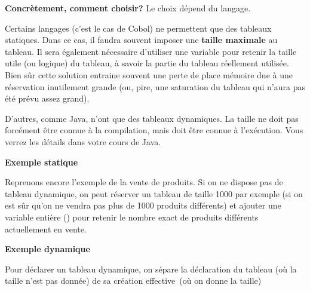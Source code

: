 	\textbf{Concrètement, comment choisir?}
	Le choix dépend du langage.

	Certains langages (c’est le cas de Cobol) ne permettent 
	que des tableaux statiques. Dans ce cas, il faudra souvent
	imposer une \textbf{taille maximale} au tableau. 
	Il sera également nécessaire d’utiliser une variable 
	pour retenir la taille utile (ou logique) du tableau, 
	à savoir la partie du tableau réellement utilisée.
	Bien sûr cette solution entraine souvent une perte de place mémoire due
	à une réservation inutilement grande (ou, pire, une saturation du
	tableau qui n’aura pas été prévu assez grand).
	
	D'autres, comme Java, n'ont que des tableaux dynamiques. La taille ne doit 
	pas forcément être connue à la compilation, mais doit être connue à
	l'exécution. Vous verrez les détails dans votre cours de Java.

	\textbf{Exemple statique}

	Reprenons encore l’exemple de la vente de produits. 
	Si on ne dispose pas de tableau dynamique, on peut réserver
	un tableau de taille 1000 par exemple (si on est sûr qu’on ne vendra
	pas plus de 1000 produits différents) et ajouter une variable entière
	() pour retenir 
	le nombre exact de produits différents actuellement en vente.
	

	\textbf{Exemple dynamique}
	
	Pour déclarer un tableau dynamique, on sépare la déclaration du tableau
	(où la taille n’est pas donnée) de sa création effective~(où on donne
	la taille)

